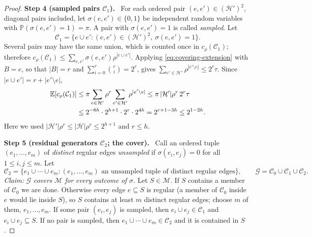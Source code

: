 \documentclass[11pt,letterpaper]{article}
\theoremstyle{definition}
\theoremstyle{remark}
\numberwithin{equation}{section}
\newcommand{\step}[1]{\par\medskip\noindent\textbf{#1}\ }
\begin{document}
\begin{proof}
\step{Step 4 (sampled pairs $\mathcal C_1$).}
For each ordered pair \((e,e')\in(\mathcal H')^2\), diagonal pairs
included, let $\sigma(e,e')\in\{0,1\}$ be independent random variables with
$\mathbb P(\sigma(e,e')=1)=\pi$. A pair with $\sigma(e,e')=1$ is called
\emph{sampled}. Let
\[
\mathcal C_1=\{e\cup e':(e,e')\in(\mathcal H')^2,\ \sigma(e,e')=1\}.
\]
Several pairs may have the same union, which is counted once in
$c_\rho(\mathcal C_1)$; therefore
$c_\rho(\mathcal C_1)\le\sum_{e,e'}\sigma(e,e')\rho^{|e\cup e'|}$.
Applying \eqref{eq:covering-extension} with \(B=e\), so that \(|B|=r\) and
$\sum_{i=0}^r\binom ri=2^r$, gives
$\sum_{e'\in\mathcal H'}\rho^{|e'\setminus e|}\le2^r\tau$. Since
$|e\cup e'|=r+|e'\setminus e|$,
\begin{align}
\mathbb E[c_\rho(\mathcal C_1)]
&\le\pi\sum_{e\in\mathcal H'}\rho^{r}
    \sum_{e'\in\mathcal H'}\rho^{|e'\setminus e|}
\le\pi\,|\mathcal H'|\rho^r\,2^r\tau
\notag\\
&\le2^{-6h}\cdot2^{h+1}\cdot2^{r}\cdot2^{4h}
=2^{r+1-3h}\le2^{1-2h}.
\label{eq:covering-pair-cost}
\end{align}
Here we used $|\mathcal H'|\rho^r\le|\mathcal H|\rho^r\le2^{h+1}$ and
$r\le h$.

\step{Step 5 (residual generators $\mathcal C_2$; the cover).}
Call an ordered tuple \((e_1,\ldots,e_m)\) of \emph{distinct} regular
edges \emph{unsampled} if $\sigma(e_i,e_j)=0$ for all $1\le i,j\le m$. Let
\[
\mathcal C_2=\{e_1\cup\cdots\cup e_m:
 (e_1,\ldots,e_m)\text{ an unsampled tuple of distinct regular edges}\},
\qquad
\mathcal G=\mathcal C_0\cup\mathcal C_1\cup\mathcal C_2 .
\]
\emph{Claim: $\mathcal G$ covers $\mathcal M$ for every outcome of
$\sigma$.} Let $S\in\mathcal M$. If $S$ contains a member of
$\mathcal C_0$ we are done. Otherwise every edge $e\subseteq S$ is regular
(a member of $\mathcal C_0$ inside $e$ would lie inside $S$), so $S$
contains at least $m$ distinct regular edges; choose $m$ of them,
$e_1,\ldots,e_m$. If some pair $(e_i,e_j)$ is sampled, then
$e_i\cup e_j\in\mathcal C_1$ and $e_i\cup e_j\subseteq S$. If no pair is
sampled, then $e_1\cup\cdots\cup e_m\in\mathcal C_2$ and it is contained in
$S$.


\end{proof}
\end{document}
